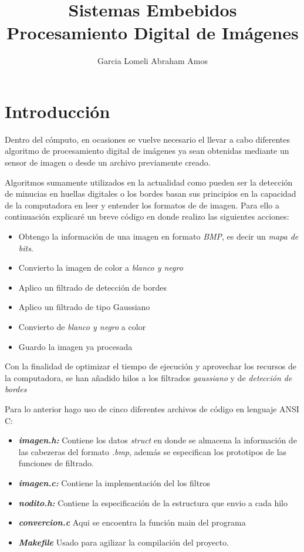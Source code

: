 \documentclass[11pt,a4paper]{article}
\author{Garcia Lomeli Abraham Amos}
\title{Sistemas Embebidos\\Procesamiento Digital de Imágenes}
\begin{document}
\maketitle
\tableofcontents
\newpage
\section{Introducción}
Dentro del cómputo, en ocasiones se vuelve necesario el llevar a cabo diferentes algoritmo de procesamiento digital de imágenes ya sean obtenidas mediante un sensor de imagen o desde un archivo previamente creado.

Algoritmos sumamente utilizados en la actualidad como pueden ser la detección de minucias en huellas digitales o los bordes basan sus principios en la capacidad de la computadora en leer y entender los formatos de de imagen. Para ello a continuación explicaré un breve código en donde realizo las siguientes acciones:

\begin{itemize}
\item Obtengo la información de una imagen en formato \textit{BMP}, es decir un \textit{mapa de bits}.
\item Convierto la imagen de color a \textit{blanco y negro}
\item Aplico un filtrado de detección de bordes
\item Aplico un filtrado de tipo Gaussiano
\item Convierto de \textit{blanco y negro} a color
\item Guardo la imagen ya procesada
\end{itemize}  

Con la finalidad de optimizar el tiempo de ejecución y aprovechar los recursos de la computadora, se han añadido hilos a los filtrados \textit{gaussiano} y de \textit{detección de bordes}

Para lo anterior hago uso de cinco diferentes archivos de código en lenguaje ANSI C:

\begin{itemize}
\item \textit{\textbf{imagen.h:}} Contiene los datos \textit{struct} en donde se almacena la información de las cabezeras del formato \textit{.bmp}, además se especifican los prototipos de las funciones de filtrado.
\item \textbf{\textit{imagen.c:}} Contiene la implementación del los filtros
\item \textbf{\textit{nodito.h:}} Contiene la especificación de la estructura que envio a cada hilo 
\item \textbf{\textit{convercion.c}} Aqui se encoentra la función main del programa
\item \textbf{\textit{Makefile}} Usado para agilizar la compilación del proyecto.
\end{itemize}
\end{document}
